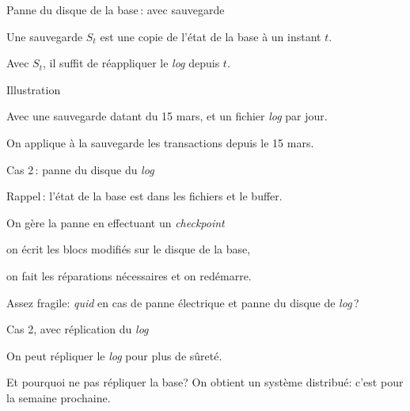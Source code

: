 \documentclass[aspectratio=169, handout]{beamer} %
\begin{document}
\begin{frame}{Panne du disque de la base\,: avec sauvegarde}

Une \alert{sauvegarde} $S_t$ est une copie de \alert{l'état de la base} à un instant $t$.

\vfill


\vfill

\begin{blocgauche}
Avec  $S_t$, il suffit
de réappliquer le  \textit{log} depuis $t$.
\end{blocgauche}
\end{frame}


\begin{frame}{Illustration}

Avec une sauvegarde datant du 15 mars, et un fichier \textit{log} par jour.

\vfill


\vfill
\begin{blocgauche}
On applique à la sauvegarde les transactions depuis le 15 mars.
\end{blocgauche}
\end{frame}

\begin{frame}{Cas 2\,: panne du disque du \textit{log}}

Rappel\,: l'état de la base est dans les fichiers \alert{et} le buffer.

\vfill

On gère la panne en effectuant un \textit{checkpoint}

\begin{redbullet}
  \item on écrit les blocs modifiés sur le disque de la base,
        \item on fait les réparations nécessaires et on redémarre.
\end{redbullet}

\vfill

\begin{blocgauche}
Assez fragile: \textit{quid} en cas de panne électrique
\alert{et} panne du disque de \textit{log}\,?
\end{blocgauche}

\end{frame}


\begin{frame}{Cas 2, avec réplication du \textit{log}}

On peut répliquer le \textit{log} pour plus de sûreté.

\vfill


\vfill

\begin{blocgauche}
Et pourquoi ne pas répliquer la base? On obtient un \alert{système
distribué}: c'est pour la semaine prochaine.
\end{blocgauche}

\end{frame}
\end{document}
